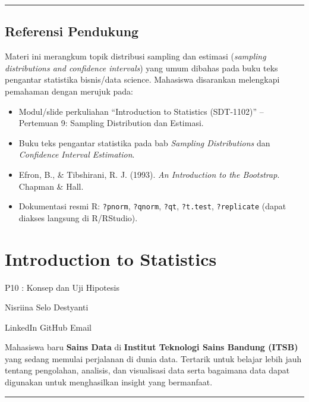 \documentclass[
  indonesian,
  letterpaper,
]{book}
\providecommand{\tightlist}{%
  \setlength{\itemsep}{0pt}\setlength{\parskip}{0pt}}
\begin{document}
\begin{center}\rule{0.5\linewidth}{0.5pt}\end{center}

\section{Referensi Pendukung}\label{referensi-pendukung}

Materi ini merangkum topik distribusi sampling dan estimasi
(\emph{sampling distributions and confidence intervals}) yang umum
dibahas pada buku teks pengantar statistika bisnis/data science.
Mahasiswa disarankan melengkapi pemahaman dengan merujuk pada:

\begin{itemize}
\tightlist
\item
  Modul/slide perkuliahan ``Introduction to Statistics (SDT-1102)'' --
  Pertemuan 9: Sampling Distribution dan Estimasi.
\item
  Buku teks pengantar statistika pada bab \emph{Sampling Distributions}
  dan \emph{Confidence Interval Estimation}.
\item
  Efron, B., \& Tibshirani, R. J. (1993). \emph{An Introduction to the
  Bootstrap}. Chapman \& Hall.
\item
  Dokumentasi resmi R: \texttt{?pnorm}, \texttt{?qnorm}, \texttt{?qt},
  \texttt{?t.test}, \texttt{?replicate} (dapat diakses langsung di
  R/RStudio).
\end{itemize}


\chapter{Introduction to Statistics}\label{introduction-to-statistics-1}

P10 : Konsep dan Uji Hipotesis

\hfill\break

Nisriina Selo Destyanti

LinkedIn {\textbar{}} GitHub {\textbar{}} Email

Mahasiswa baru \textbf{Sains Data} di \textbf{Institut Teknologi Sains
Bandung (ITSB)} yang sedang memulai perjalanan di dunia data. Tertarik
untuk belajar lebih jauh tentang pengolahan, analisis, dan visualisasi
data serta bagaimana data dapat digunakan untuk menghasilkan insight
yang bermanfaat.

\begin{center}\rule{0.5\linewidth}{0.5pt}\end{center}
\end{document}
